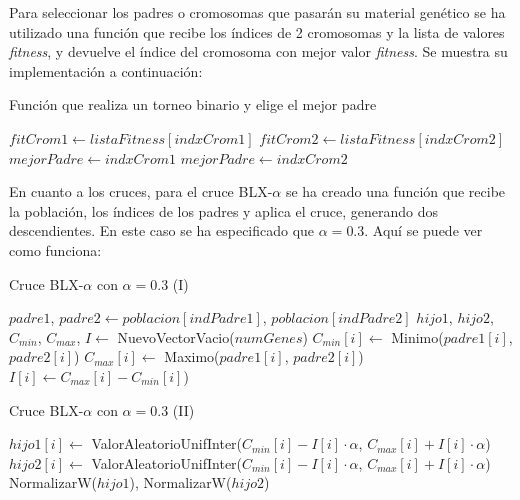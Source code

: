 \documentclass[11pt,a4paper]{article}
\begin{document}
Para seleccionar los padres o cromosomas que pasarán su material genético se ha utilizado una función que recibe los índices
de 2 cromosomas y la lista de valores \textit{fitness}, y devuelve el índice del cromosoma con mejor valor \textit{fitness}.
Se muestra su implementación a continuación:

\begin{algorithm}[H]
\caption{Función que realiza un torneo binario y elige el mejor padre}
\begin{algorithmic}[1]
\State $fitCrom1 \gets listaFitness[indxCrom1]$
\State $fitCrom2 \gets listaFitness[indxCrom2]$
\State $mejorPadre \gets indxCrom1$
	\State $mejorPadre \gets indxCrom2$
\EndIf
\State {}
\EndFunction
\end{algorithmic}
\end{algorithm}

En cuanto a los cruces, para el cruce BLX-$\alpha$ se ha creado una función que recibe la población, los índices
de los padres y aplica el cruce, generando dos descendientes. En este caso se ha especificado que $\alpha = 0.3$.
Aquí se puede ver como funciona:

\begin{algorithm}[H]
\caption{Cruce BLX-$\alpha$ con $\alpha = 0.3$ (I)}
\begin{algorithmic}[1]
\State $padre1$, $padre2 \gets poblacion[indPadre1]$, $poblacion[indPadre2]$
\State $hijo1$, $hijo2$, $C_{min}$, $C_{max}$, $I \gets$ NuevoVectorVacio($numGenes$)
	\State $C_{min}[i] \gets$ Minimo($padre1[i]$, $padre2[i]$)
	\State $C_{max}[i] \gets$ Maximo($padre1[i]$, $padre2[i]$)
	\State $I[i] \gets C_{max}[i] - C_{min}[i]$)
\EndFor
{}
\end{algorithmic}
\end{algorithm}

\begin{algorithm}[H]
\caption{Cruce BLX-$\alpha$ con $\alpha = 0.3$ (II)}
\begin{algorithmic}[1]
	\State $hijo1[i] \gets$ ValorAleatorioUnifInter($C_{min}[i] - I[i] \cdot \alpha$, $C_{max}[i] + I[i] \cdot \alpha$)
	\State $hijo2[i] \gets$ ValorAleatorioUnifInter($C_{min}[i] - I[i] \cdot \alpha$, $C_{max}[i] + I[i] \cdot \alpha$)
\EndFor
\State NormalizarW($hijo1$), NormalizarW($hijo2$)
\State {}
\EndFunction
\end{algorithmic}
\end{algorithm}
\end{document}
